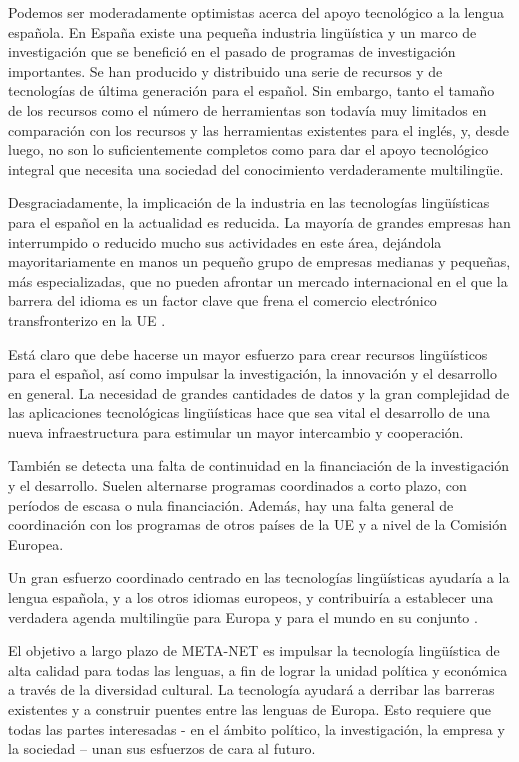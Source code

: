 \begin{multicols}{2}
Podemos ser moderadamente optimistas acerca del apoyo tecnológico a la lengua española. En España existe una pequeña industria lingüística y un marco de investigación que se benefició en el pasado de programas de investigación importantes. Se han producido y distribuido una serie de recursos y de tecnologías de última generación para el español. Sin embargo, tanto el tamaño de los recursos como el número de herramientas son todavía muy limitados en comparación con los recursos y las herramientas existentes para el inglés, y, desde luego, no son lo suficientemente completos como para dar el apoyo tecnológico integral que necesita una sociedad del conocimiento verdaderamente multilingüe.

Desgraciadamente, la implicación de la industria en las tecnologías lingüísticas para el español en la actualidad es reducida. La mayoría de grandes empresas han interrumpido o reducido mucho sus actividades en este área, dejándola mayoritariamente en manos un pequeño grupo de empresas medianas y pequeñas, más especializadas, que no pueden afrontar un mercado internacional en el que la barrera del idioma es un factor clave que frena el comercio electrónico transfronterizo en la UE \cite{EUecommerce}.

Está claro que debe hacerse un mayor esfuerzo para crear recursos lingüísticos para el español, así como impulsar la investigación, la innovación y el desarrollo en general. La necesidad de grandes cantidades de datos y la gran complejidad de las aplicaciones tecnológicas lingüísticas hace que sea vital el desarrollo de una nueva infraestructura para estimular un mayor intercambio y cooperación.

También se detecta una falta de continuidad en la financiación de la investigación y el desarrollo. Suelen alternarse programas coordinados a corto plazo, con períodos de escasa o nula financiación. Además, hay una falta general de coordinación con los programas de otros países de la UE y a nivel de la Comisión Europea.

Un gran esfuerzo coordinado centrado en las tecnologías lingüísticas ayudaría a la lengua española, y a los otros idiomas europeos, y contribuiría a establecer una verdadera agenda multilingüe para Europa y para el mundo en su conjunto \cite{HuLaTec}. 

El objetivo a largo plazo de META-NET es impulsar la tecnología lingüística de alta calidad para todas las lenguas, a fin de lograr la unidad política y económica a través de la diversidad cultural. La tecnología ayudará a derribar las barreras existentes y a construir puentes entre las lenguas de Europa. Esto requiere que todas las partes interesadas - en el ámbito político, la investigación, la empresa y la sociedad – unan sus esfuerzos de cara al futuro. 
\end{multicols}

